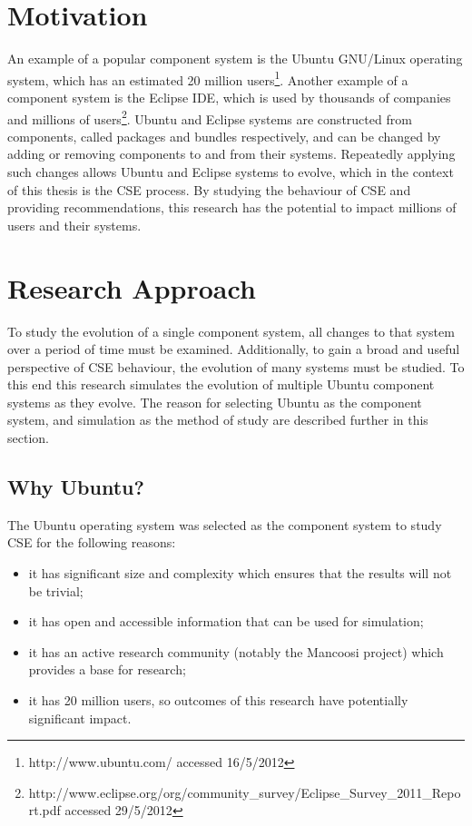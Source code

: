 \section{Motivation}
An example of a popular component system is the Ubuntu GNU/Linux operating system, which has an estimated 20 million users\footnote{http://www.ubuntu.com/ accessed 16/5/2012}. 
Another example of a component system is the Eclipse IDE, which is used by thousands of companies and millions of users\footnote{http://www.eclipse.org/org/community\_survey/Eclipse\_Survey\_2011\_Report.pdf  accessed 29/5/2012}.
Ubuntu and Eclipse systems are constructed from components, called packages and bundles respectively, 
and can be changed by adding or removing components to and from their systems.
Repeatedly applying such changes allows Ubuntu and Eclipse systems to evolve, which in the context of this thesis is the CSE process.
By studying the behaviour of CSE and providing recommendations, this research has the potential to impact millions of users and their systems.

\section{Research Approach}
To study the evolution of a single component system, all changes to that system over a period of time must be examined.
Additionally, to gain a broad and useful perspective of CSE behaviour, the evolution of many systems must be studied.
To this end this research simulates the evolution of multiple Ubuntu component systems as they evolve.
The reason for selecting Ubuntu as the component system, and simulation as the method of study are described further in this section.

\subsection{Why Ubuntu?}
The Ubuntu operating system was selected as the component system to study CSE for the following reasons:
\begin{itemize}
  \item it has significant size and complexity which ensures that the results will not be trivial;
  \item it has open and accessible information that can be used for simulation;
  \item it has an active research community (notably the Mancoosi project) which provides a base for research;
  \item it has 20 million users, so outcomes of this research have potentially significant impact.
\end{itemize} 

